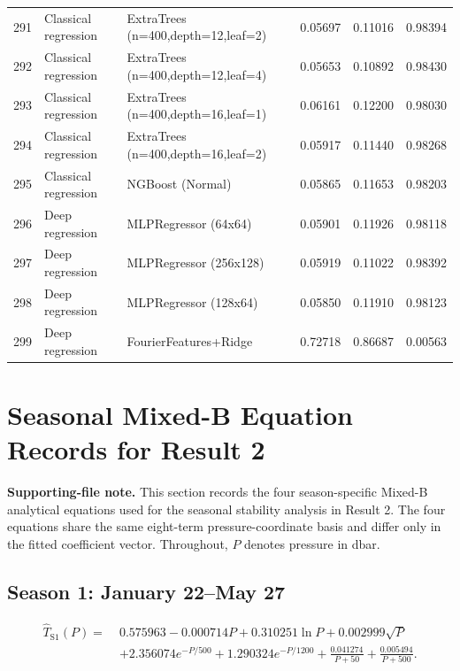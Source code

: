 \documentclass[10pt]{article}
\begin{document}
\begin{longtable}{C{0.75cm}L{2.35cm}L{8.0cm}C{1.15cm}C{1.15cm}C{1.15cm}}
291 & Classical regression & ExtraTrees (n=400,depth=12,leaf=2) & 0.05697 & 0.11016 & 0.98394 \\
292 & Classical regression & ExtraTrees (n=400,depth=12,leaf=4) & 0.05653 & 0.10892 & 0.98430 \\
293 & Classical regression & ExtraTrees (n=400,depth=16,leaf=1) & 0.06161 & 0.12200 & 0.98030 \\
294 & Classical regression & ExtraTrees (n=400,depth=16,leaf=2) & 0.05917 & 0.11440 & 0.98268 \\
295 & Classical regression & NGBoost (Normal) & 0.05865 & 0.11653 & 0.98203 \\
296 & Deep regression & MLPRegressor (64x64) & 0.05901 & 0.11926 & 0.98118 \\
297 & Deep regression & MLPRegressor (256x128) & 0.05919 & 0.11022 & 0.98392 \\
298 & Deep regression & MLPRegressor (128x64) & 0.05850 & 0.11910 & 0.98123 \\
299 & Deep regression & FourierFeatures+Ridge & 0.72718 & 0.86687 & 0.00563 \\
\bottomrule
\end{longtable}
\endgroup

\section{Seasonal Mixed-B Equation Records for Result 2}
\label{sec:seasonal-mixedb-equations}

\noindent\textcolor{noteRed}{\textbf{Supporting-file note.}}
This section records the four season-specific Mixed-B analytical equations used for the seasonal stability analysis in Result 2.
The four equations share the same eight-term pressure-coordinate basis and differ only in the fitted coefficient vector.
Throughout, $P$ denotes pressure in dbar.

\subsection{Season 1: January 22--May 27}

\begin{equation}
\begin{aligned}
\hat{T}_{\mathrm{S1}}(P) =\;& 0.575963 - 0.000714 P + 0.310251 \ln P + 0.002999 \sqrt{P} \\
& + 2.356074 e^{-P/500} + 1.290324 e^{-P/1200}
  + \frac{0.041274}{P+50} + \frac{0.005494}{P+500}.
\end{aligned}
\end{equation}
\end{document}
